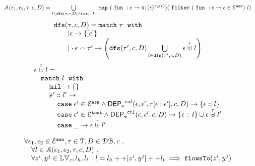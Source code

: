 \begin{defn}
\[
\begin{array}{l}
	\mathcal{A}(\mathtt{\epsilon}_1, \mathtt{\epsilon}_2, \mathtt{\tau}, c, D)
	= 
	\bigcup\limits_{l \in \mathtt{dfs}(\mathtt{\tau}, c, D) \land l = \mathtt{\epsilon}_1 :: l'}
	~\mathtt{map}~ 
	(~\mathtt{fun}~ : \mathtt{\epsilon} \to \pi_1(\mathtt{\epsilon})^{\pi_2(\mathtt{\epsilon})})	
	(~\mathtt{filter}~ 
		(~\mathtt{fun}~ : \mathtt{\epsilon} \to  \mathtt{\epsilon} \in \mathcal{E}^{\mathtt{{asn}}}) ~ l)
	\end{array}
\]
%
%
\[
\begin{array}{l}
	\kw{dfs}(\trace, c, D)
	= 
	\ematch~  \trace ~ \ewith
	\\ \qquad
	| \event \to \{[\event]\}
	\\ \qquad
	|  \cdot \event \tracecat \trace' \to  
	\left( \kw{dfs}(\trace', c, D) \bigcup\limits_{l \in \kw{dfs}(\trace', c, D) }
	\event \stackrel{\trace}{\uplus} l \right)
\end{array}
\]
%
%
\[
\begin{array}{l}
	\mathtt{\epsilon} \stackrel{\mathtt{\tau}}{\uplus} l
	= 
	\\ \quad
	\mathtt{match}~  l ~ \;\mathtt{with}\;
	\\ \qquad
	| \mathtt{nil} \to 	\{\}
	\\ \qquad
	|  \mathtt{\epsilon}' :: l' \to  
	\\ \quad \qquad 	
	\mathtt{\;case\;} \mathtt{\epsilon}' \in \mathcal{E}^{\mathtt{{asn}}}  \land \mathsf{DEP_{\mathtt{e}}}^{val}(\mathtt{\epsilon}, \mathtt{\epsilon}', \mathtt{\tau}[\mathtt{\epsilon}:\mathtt{\epsilon}'], c, D)
	\to \{\mathtt{\epsilon}::l\}
	\\ \quad \qquad 	
	\mathtt{\;case\;} \mathtt{\epsilon}' \in \mathcal{E}^{\mathtt{{test}}} \land \mathsf{DEP_{\mathtt{e}}}^{\mathtt{{ctl}}}(\mathtt{\epsilon}, \mathtt{\epsilon}', c, D)
	\to \{\mathtt{\epsilon} :: l\} \cup \mathtt{\epsilon} \stackrel{\mathtt{\tau}}{\uplus} l'
	\\ \quad \qquad 	
	\mathtt{\;case\;} \_ \to \mathtt{\epsilon} \stackrel{\mathtt{\tau}}{\uplus} l' 
\end{array}
\]
\end{defn}
%
\begin{thm}
\label{thm:alg_correct}
\[
\begin{array}{l}
  \forall \mathtt{\epsilon}_1, \mathtt{\epsilon}_2 \in \mathcal{E}^{\mathtt{{asn}}}, \mathtt{\tau} \in \mathcal{T}, D \in \mathcal{DB} , c ~.~
  \\ \quad 
   \forall l \in \mathcal{A}(\mathtt{\epsilon}_1, \mathtt{\epsilon}_2, \mathtt{\tau}, c, D) ~.~
   \\ \quad 
   \forall z^i, y^j \in \mathbb{LV}_c, l_h, l_t ~.~ 
   l = l_h ++ [z^i, y^j] ++ l_t 
   \implies \mathtt{flowsTo}(z^i, y^j)
\end{array}
\]
\end{thm}
